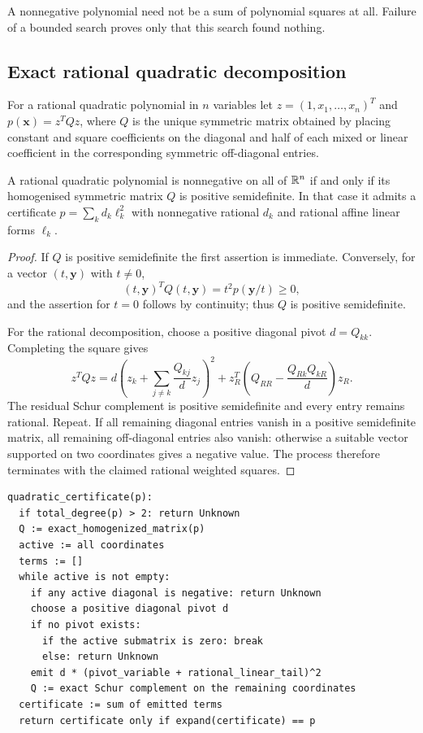\begin{remark}
A nonnegative polynomial need not be a sum of polynomial squares at all. Failure
of a bounded search proves only that this search found nothing.
\end{remark}

\subsection{Exact rational quadratic decomposition}
\label{sec:quadratic}

For a rational quadratic polynomial in $n$ variables let
$z=(1,x_1,\ldots,x_n)^{T}$ and $p(\bm x)=z^{T}Qz$, where $Q$ is the unique
symmetric matrix obtained by placing constant and square coefficients on the
diagonal and half of each mixed or linear coefficient in the corresponding
symmetric off-diagonal entries.

\begin{theorem}
\label{thm:quadratic}
A rational quadratic polynomial is nonnegative on all of $\mathbb{R}^n$ if and only if
its homogenised symmetric matrix $Q$ is positive semidefinite. In that case it
admits a certificate $p=\sum_k d_k\ell_k^2$ with nonnegative rational $d_k$ and
rational affine linear forms $\ell_k$.
\end{theorem}
\begin{proof}
If $Q$ is positive semidefinite the first assertion is immediate. Conversely,
for a vector $(t,\bm y)$ with $t\ne0$,
\[
 (t,\bm y)^{T}Q(t,\bm y)=t^2p(\bm y/t)\ge0,
\]
and the assertion for $t=0$ follows by continuity; thus $Q$ is positive
semidefinite.

For the rational decomposition, choose a positive diagonal pivot $d=Q_{kk}$.
Completing the square gives
\[
 z^{T}Qz=d\left(z_k+\sum_{j\ne k}\frac{Q_{kj}}{d}z_j\right)^2
    +z_R^{T}\!\left(Q_{RR}-\frac{Q_{Rk}Q_{kR}}{d}\right)z_R .
\]
The residual Schur complement is positive semidefinite and every entry remains
rational. Repeat. If all remaining diagonal entries vanish in a positive
semidefinite matrix, all remaining off-diagonal entries also vanish: otherwise a
suitable vector supported on two coordinates gives a negative value. The process
therefore terminates with the claimed rational weighted squares.
\end{proof}

\begin{lstlisting}
quadratic_certificate(p):
  if total_degree(p) > 2: return Unknown
  Q := exact_homogenized_matrix(p)
  active := all coordinates
  terms := []
  while active is not empty:
    if any active diagonal is negative: return Unknown
    choose a positive diagonal pivot d
    if no pivot exists:
      if the active submatrix is zero: break
      else: return Unknown
    emit d * (pivot_variable + rational_linear_tail)^2
    Q := exact Schur complement on the remaining coordinates
  certificate := sum of emitted terms
  return certificate only if expand(certificate) == p
\end{lstlisting}

